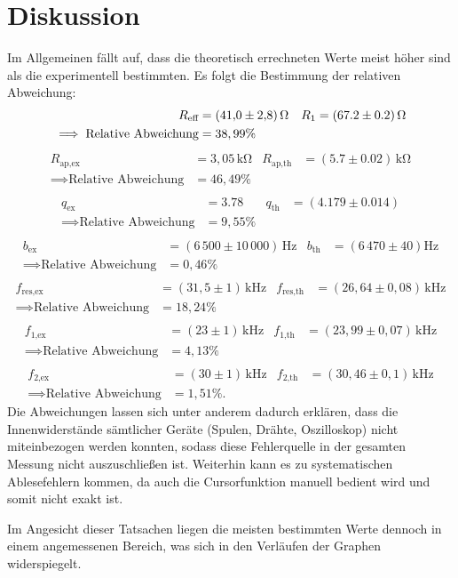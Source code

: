 \section{Diskussion}
\label{sec:Diskussion}

Im Allgemeinen fällt auf, dass die theoretisch errechneten 
Werte meist höher sind als die experimentell bestimmten. Es folgt die Bestimmung der relativen Abweichung:
\begin{align*}
R_\text{eff} &= (\num{41.0 +- 2.8})\,\si{\ohm} & R_1 &= (67.2 \pm 0.2 )\,\si{\ohm} \\
\implies \text{Relative Abweichung} &= 38,99\% \\
\end{align*}
\begin{align*}
R_\text{ap,ex} &= 3,05\,\si{\kilo\ohm} & R_\text{ap,th} &= (5.7 \pm 0.02)\,\si{\kilo\ohm}\\
\implies \text{Relative Abweichung} &= 46,49\% \\
\end{align*}
\begin{align*}
q_\text{ex} &= \num{3.78} & q_\text{th} &= (4.179 \pm 0.014)\\
\implies \text{Relative Abweichung} &= 9,55\% \\
\end{align*}
\begin{align*}
b_\text{ex} &= (6\,500 \pm 10\,000)\,\si{\hertz} & b_\text{th} &= (6\,470 \pm 40)\si{\hertz} \\
\implies \text{Relative Abweichung} &= 0,46\% \\
\end{align*}
\begin{align*}
f_\text{res,ex} &= (31,5 \pm 1)\, \si{\kilo\hertz} & f_\text{res,th} &= (26,64 \pm 0,08)\,\si{\kilo\hertz}\\
\implies \text{Relative Abweichung} &= 18,24\% \\
\end{align*}
\begin{align*}
f_\text{1,ex} &= (23 \pm 1)\,\si{\kilo\hertz} & f_\text{1,th} &= (23,99 \pm 0,07)\,\si{\kilo\hertz}\\
\implies \text{Relative Abweichung} &= 4,13\% \\
\end{align*}
\begin{align*}
f_\text{2,ex} &= (30 \pm 1)\,\si{\kilo\hertz} & f_\text{2,th} &= (30,46 \pm 0,1)\,\si{\kilo\hertz} \\
\implies \text{Relative Abweichung} &= 1,51\%.
\end{align*}
Die Abweichungen lassen sich unter anderem dadurch erklären, dass die Innenwiderstände 
sämtlicher Geräte (Spulen, Drähte, Oszilloskop) nicht miteinbezogen werden konnten, 
sodass diese Fehlerquelle in der gesamten Messung nicht auszuschließen ist. Weiterhin kann
es zu systematischen Ablesefehlern kommen, da auch die Cursorfunktion manuell bedient wird
und somit nicht exakt ist.

\noindent Im Angesicht dieser Tatsachen liegen die meisten bestimmten Werte dennoch in einem angemessenen Bereich, was sich in den 
Verläufen der Graphen widerspiegelt.